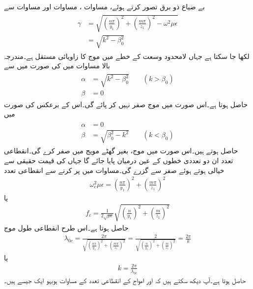 بے ضیاع  ذو برق تصور کرتے ہوئے، مساوات ،  مساوات  اور مساوات  سے
\begin{gather}
\begin{aligned}\label{مساوات_مویج_عرضی_مقناطیسی_مستقل_موج}
\gamma&=\sqrt{\left(\frac{n\pi}{y_1}\right)^2+\left(\frac{m\pi}{z_1}\right)^2-\omega^2 \mu \epsilon}\\
&=\sqrt{k^2-\beta_0^2}
\end{aligned}
\end{gather}
لکھا جا سکتا ہے جہاں  لامحدود وسعت کے خطے میں موج کا زاویائی مستقل  ہے۔مندرجہ بالا مساوات میں  کی صورت میں  سے
\begin{gather}
\begin{aligned}\label{مساوات_مویج_تضعیفی_مستقل_الف}
\alpha&=\sqrt{k^2-\beta_0^2}  \quad \quad (k>\beta_0)\\
\beta &=0
\end{aligned}
\end{gather}
حاصل ہوتا ہے۔اس صورت میں موج صفر نہیں کر پائے گی۔اس کے برعکس  کی صورت میں
\begin{gather}
\begin{aligned}\label{مساوات_مویج_زاویائی_مستقل_الف}
\alpha&=0\\
\beta &= \sqrt{\beta_0^2-k^2}  \quad \quad (k<\beta_0)
\end{aligned}
\end{gather}
حاصل ہوتے ہیں۔اس صورت میں موج، بغیر گھٹے مویج میں صفر کرے گی۔انقطاعی تعدد ان دو تعددی خطوں کے عین درمیان پایا جائے گا جہاں  کی قیمت حقیقی سے خیالی ہوتے ہوئے صفر سے گزرے گی۔مساوات  میں  پر کرنے سے انقطاعی تعدد
\begin{align}
\omega_c^2 \mu \epsilon =\left(\frac{n\pi}{y_1}\right)^2+\left(\frac{m\pi}{z_1}\right)^2
\end{align}
یا
\begin{align}
f_c =\frac{1}{2 \sqrt{\mu \epsilon}}\sqrt{\left(\frac{n}{y_1}\right)^2+\left(\frac{m}{z_1}\right)^2}
\end{align}
حاصل ہوتا ہے۔اس طرح انقطاعی طول موج
\begin{align}\label{مساوات_مویج_مستطیلی_انقطاعی_طول}
\lambda_{0c}=\frac{2\pi}{\sqrt{\left(\frac{n\pi}{y_1}\right)^2+\left(\frac{m\pi}{z_1}\right)^2}}=\frac{2}{\sqrt{\left(\frac{n}{y_1}\right)^2+\left(\frac{m}{z_1}\right)^2}}=\frac{2\pi}{k}
\end{align}
یا
\begin{align}
k=\frac{2\pi}{\lambda_{0c}}
\end{align}
حاصل ہوتا ہے۔آپ دیکھ سکتے ہیں کہ  اور  امواج کے انقطاعی تعدد کے مساوات ہوبہو ایک جیسے ہیں۔

